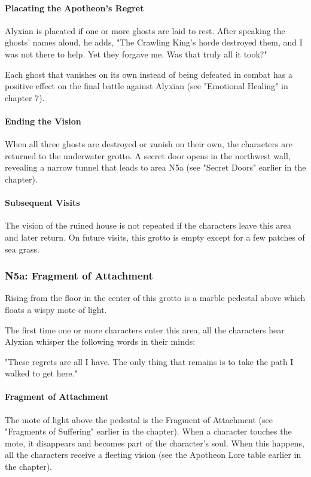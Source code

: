 \documentclass[10pt,a4paper,twoside,bg=print,twocolumn,openany,nodeprecatedcode]{dndbook}
\begin{document}
\paragraph{Placating the Apotheon's Regret}
Alyxian is placated if one or more ghosts are laid to rest. After speaking the ghosts' names aloud, he adds, "The Crawling King's horde destroyed them, and I was not there to help. Yet they forgave me. Was that truly all it took?"

Each ghost that vanishes on its own instead of being defeated in combat has a positive effect on the final battle against Alyxian (see "Emotional Healing" in chapter 7).

\paragraph{Ending the Vision}
When all three ghosts are destroyed or vanish on their own, the characters are returned to the underwater grotto. A secret door opens in the northwest wall, revealing a narrow tunnel that leads to area N5a (see "Secret Doors" earlier in the chapter).

\paragraph{Subsequent Visits}
The vision of the ruined house is not repeated if the characters leave this area and later return. On future visits, this grotto is empty except for a few patches of sea grass.

\subsubsection{N5a: Fragment of Attachment}
\begin{DndReadAloud}{}
Rising from the floor in the center of this grotto is a marble pedestal above which floats a wispy mote of light.

\end{DndReadAloud}

The first time one or more characters enter this area, all the characters hear Alyxian whisper the following words in their minds:

\begin{DndReadAloud}{}
"These regrets are all I have. The only thing that remains is to take the path I walked to get here."

\end{DndReadAloud}

\paragraph{Fragment of Attachment}
The mote of light above the pedestal is the Fragment of Attachment (see "Fragments of Suffering" earlier in the chapter). When a character touches the mote, it disappears and becomes part of the character's soul. When this happens, all the characters receive a fleeting vision (see the Apotheon Lore table earlier in the chapter).
\end{document}
